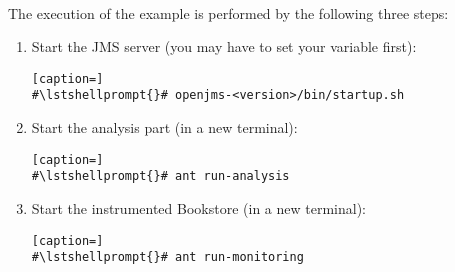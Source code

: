 \

 The execution of the example is performed by the following three steps:
\begin{enumerate}
\item Start the JMS server (you may have to set your  variable first):

\setBashListing
\begin{lstlisting}[caption=]
#\lstshellprompt{}# openjms-<version>/bin/startup.sh
\end{lstlisting}
\item Start the analysis part (in a new terminal):
\setBashListing
\begin{lstlisting}[caption=]
#\lstshellprompt{}# ant run-analysis
\end{lstlisting}
\item Start the instrumented Bookstore (in a new terminal):
\setBashListing
\begin{lstlisting}[caption=]
#\lstshellprompt{}# ant run-monitoring
\end{lstlisting}
\end{enumerate}